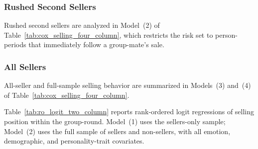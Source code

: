 \documentclass[11pt]{article}
\begin{document}
\subsubsection{Rushed Second Sellers}

Rushed second sellers are analyzed in Model~(2) of Table~\ref{tab:cox_selling_four_column}, which restricts the risk set to person-periods that immediately follow a group-mate's sale.

\subsubsection{All Sellers}

All-seller and full-sample selling behavior are summarized in Models~(3) and~(4) of Table~\ref{tab:cox_selling_four_column}.

Table~\ref{tab:ro_logit_two_column} reports rank-ordered logit regressions of selling position within the group-round. Model~(1) uses the sellers-only sample; Model~(2) uses the full sample of sellers and non-sellers, with all emotion, demographic, and personality-trait covariates.

\begin{table}[H]
  \centering
  \caption{Pooled OLS: belief and period at first sale}
  \label{tab:ols_first_sale_behavior}
  
\end{table}








\vspace{1in}
\end{document}
